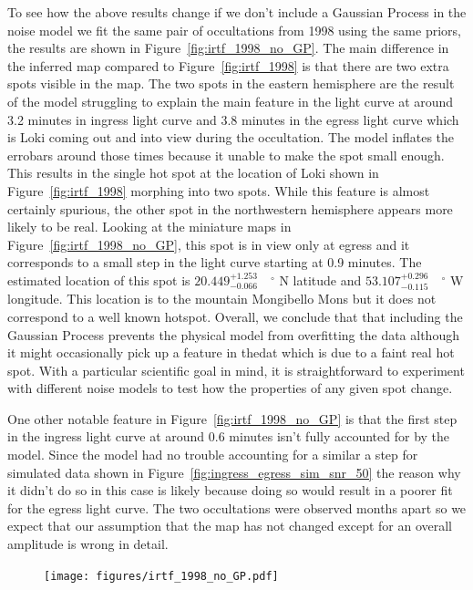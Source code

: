 \documentclass[modern]{aastex62}
\begin{document}
To see how the above results change if we don't include a Gaussian Process in the noise model we fit the same pair of occultations from 1998 using the same priors, the results are shown in Figure~\ref{fig:irtf_1998_no_GP}.
The main difference in the inferred map compared to Figure~\ref{fig:irtf_1998} is that there are two extra spots visible in the map.
The two spots in the eastern hemisphere are the result of the model struggling to explain the main feature in the light curve at around 3.2 minutes in ingress light curve and 3.8 minutes in the egress light curve which is Loki coming out and into view during the occultation.
The model inflates the errobars around those times because it unable to make the spot small enough.
This results in the single hot spot at the location of Loki shown in Figure~\ref{fig:irtf_1998} morphing into two spots.
While this feature is almost certainly spurious, the other spot in the northwestern hemisphere appears more likely to be real.
Looking at the miniature maps in Figure~\ref{fig:irtf_1998_no_GP}, this spot is in view only at egress and it corresponds to a small step in the light curve starting at 0.9 minutes.
The estimated location of this spot is $20.449_{-0.066}^{+1.253}\quad^\circ$ N latitude and $53.107_{-0.115}^{+0.296}\quad^\circ$ W longitude.
This location is to the mountain Mongibello Mons but it does not correspond to a well known hotspot.
Overall, we conclude that that including the Gaussian Process prevents the physical model from overfitting the data although it might occasionally pick up a feature in thedat which is due to a faint real hot spot.
With a particular scientific goal in mind, it is straightforward to experiment with different noise models to test how the properties of any given spot change.


One other notable feature in Figure~\ref{fig:irtf_1998_no_GP} is that the first step in the ingress light curve at around 0.6 minutes isn't fully accounted for by the model.
Since the model had no trouble accounting for a similar a step for simulated data shown in Figure~\ref{fig:ingress_egress_sim_snr_50} the reason why it didn't do so in this case is likely because doing so would result in a poorer fit for the egress light curve.
The two occultations were observed months apart so we expect that our assumption that the map has not changed except for an overall amplitude is wrong in detail.  


\begin{figure}[t!]
    \begin{centering}
    \texttt{[image: figures/irtf\_1998\_no\_GP.pdf]}
    \end{centering}
\end{figure}
\end{document}
